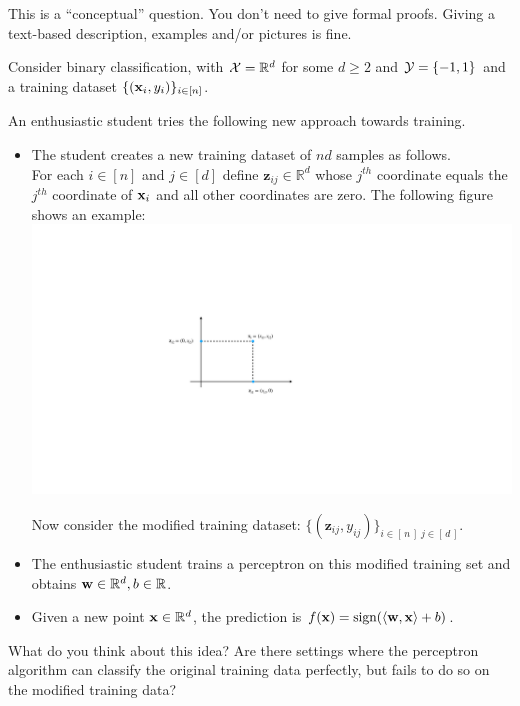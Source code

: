This is a ``conceptual'' question. You don't need to give formal proofs. Giving a text-based description, examples and/or pictures is fine.

\vspace{5mm}
Consider binary classification, with ${\cal{X}} = \mathbb{R}^d$ for some $d \geq 2$ and ${\cal Y} = \{-1,1\}$ and a  training dataset $\{(\mathbf{x}_i,y_i)\}_{i \in [n]}$.


An enthusiastic student tries the following new approach towards training.
\begin{itemize}
    \item The student creates a new training dataset of $nd$ samples as follows.\\
    For each $i \in [n]$ and $j \in [d]$ define $\mathbf{z}_{ij} \in \mathbb{R}^{d}$ whose $j^{th}$ coordinate equals the $j^{th}$ coordinate of $\mathbf{x}_i$ and all other coordinates are zero. The following figure shows an example:\\
    \includegraphics[width=0.5\linewidth]{midterm/images/enthusiastic.pdf}
    
     Now consider the modified training dataset:  $\{(\mathbf{z}_{ij},y_{ij})\}_{i\in [\,n\,]\; j\in [\,d\,]}$.

    \item The enthusiastic student trains a perceptron on this modified training set and obtains $\mathbf{w} \in \mathbb{R}^d, b \in \mathbb{R}$.
    \item Given a new point $\mathbf{x} \in \mathbb{R}^d$, the prediction is $f(\mathbf{x}) = \text{sign} (\langle \mathbf{w}, \mathbf{x} \rangle + b)$.
\end{itemize}

\vspace{10mm}

What do you think about this idea? Are there settings where the perceptron algorithm can classify the original training data perfectly, but fails to do so on the modified training data? 

